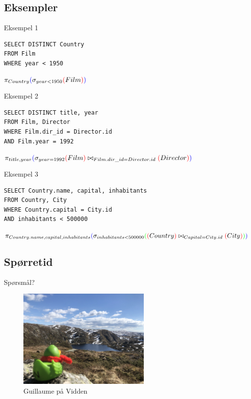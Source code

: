 \subsection*{Eksempler}
\begin{frame}[fragile]{Eksempel 1}
\begin{verbatim}
SELECT DISTINCT Country
FROM Film
WHERE year < 1950
\end{verbatim}
$\pi_{Country}\textcolor{blue}{(}\sigma_{year < 1950}\textcolor{red}{(}Film\textcolor{red}{)}\textcolor{blue}{)}$
\end{frame}

\begin{frame}[fragile]{Eksempel 2}
\begin{verbatim}
SELECT DISTINCT title, year
FROM Film, Director
WHERE Film.dir_id = Director.id
AND Film.year = 1992
\end{verbatim}
$\pi_{title, year}\textcolor{blue}{(}\sigma_{year = 1992}\textcolor{red}{(}Film\textcolor{red}{)} \bowtie_{Film.dir\_id=Director.id}\textcolor{red}{(}Director\textcolor{red}{)}\textcolor{blue}{)}$
\end{frame}

\begin{frame}[fragile]{Eksempel 3}
\begin{verbatim}
SELECT Country.name, capital, inhabitants
FROM Country, City
WHERE Country.capital = City.id
AND inhabitants < 500000
\end{verbatim}
$\pi_{Country.name, capital, inhabitants}\textcolor{blue}{(}\sigma_{inhabitants < 500000}\textcolor{green}{(}\textcolor{red}{(}Country\textcolor{red}{)}\bowtie_{Capital=City.id}\textcolor{red}{(}City\textcolor{red}{)}\textcolor{green}{)}\textcolor{blue}{)}$
\end{frame}

\subsection*{Spørretid}
\begin{frame}{Spørsmål?}
    \begin{figure}
        \centering
        \includegraphics[height = 4.9cm]{images/guillaume4.jpg}
        \caption{Guillaume på Vidden}
        \label{fig:guillaume4}
    \end{figure}
\end{frame}

